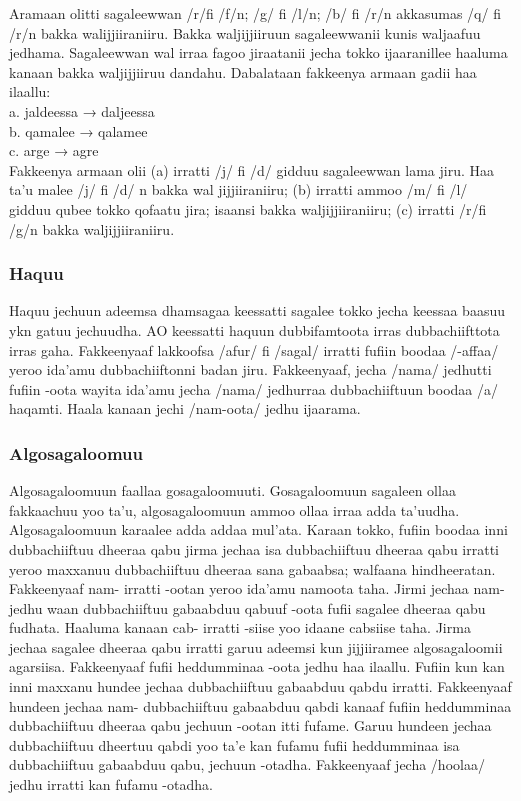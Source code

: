 \documentclass[11pt,b5paper]{book}
\begin{document}
\begin{itemize}
Aramaan olitti sagaleewwan /r/fi /f/n; /g/ fi /l/n; /b/ fi /r/n  akkasumas /q/ fi /r/n bakka walijjiiraniiru. Bakka waljijjiiruun  sagaleewwanii kunis waljaafuu jedhama. Sagaleewwan wal  irraa fagoo jiraatanii jecha tokko ijaaranillee haaluma kanaan  bakka waljijjiiruu dandahu. Dabalataan fakkeenya armaan gadii  haa ilaallu: \\
a. jaldeessa → daljeessa  \\
b. qamalee → qalamee  \\
c. arge → agre \\

Fakkeenya armaan olii (a) irratti /j/ fi /d/ gidduu sagaleewwan  lama jiru. Haa ta’u malee /j/ fi /d/ n bakka wal jijjiiraniiru; (b)  irratti ammoo /m/ fi /l/ gidduu qubee tokko qofaatu jira;  isaansi bakka waljijjiiraniiru; (c) irratti /r/fi /g/n bakka  waljijjiiraniiru.  

\subsubsection{Haquu}

Haquu jechuun adeemsa dhamsagaa keessatti sagalee tokko  jecha keessaa baasuu ykn gatuu jechuudha. AO keessatti  haquun dubbifamtoota irras dubbachiifttota irras  gaha. Fakkeenyaaf lakkoofsa /afur/ fi /sagal/ irratti fufiin  boodaa /-affaa/ yeroo ida’amu dubbachiiftonni badan jiru. Fakkeenyaaf, jecha /nama/ jedhutti fufiin {-oota} wayita ida'amu jecha /nama/ jedhurraa dubbachiiftuun boodaa /a/ haqamti. Haala kanaan jechi /nam-oota/ jedhu ijaarama. 

\subsubsection{Algosagaloomuu}

Algosagaloomuun faallaa gosagaloomuuti. Gosagaloomuun  sagaleen ollaa fakkaachuu yoo ta’u, algosagaloomuun ammoo  ollaa irraa adda ta’uudha. Algosagaloomuun karaalee adda  addaa mul’ata. Karaan tokko, fufiin boodaa inni dubbachiiftuu dheeraa qabu jirma jechaa isa dubbachiiftuu dheeraa qabu  irratti yeroo maxxanuu dubbachiiftuu dheeraa sana gabaabsa;  walfaana hindheeratan. Fakkeenyaaf {nam-} irratti {-oota}n  yeroo ida’amu namoota taha. Jirmi jechaa {nam-} jedhu waan  dubbachiiftuu gabaabduu qabuuf {-oota} fufii sagalee dheeraa  qabu fudhata. Haaluma kanaan {cab-} irratti {-siise} yoo  idaane cabsiise taha. Jirma jechaa sagalee dheeraa qabu  irratti garuu adeemsi kun jijjiiramee algosagaloomii  agarsiisa. Fakkeenyaaf fufii heddumminaa {-oota} jedhu haa ilaallu. Fufiin kun kan inni maxxanu hundee jechaa dubbachiiftuu gabaabduu qabdu irratti. Fakkeenyaaf hundeen jechaa {nam-} dubbachiiftuu gabaabduu qabdi kanaaf fufiin heddumminaa dubbachiiftuu dheeraa qabu jechuun {-oota}n itti fufame. Garuu hundeen jechaa dubbachiiftuu dheertuu qabdi yoo ta'e kan fufamu fufii heddumminaa isa dubbachiiftuu gabaabduu qabu, jechuun {-ota}dha. Fakkeenyaaf jecha /hoolaa/ jedhu irratti kan fufamu {-ota}dha. 


\end{itemize}
\end{document}
